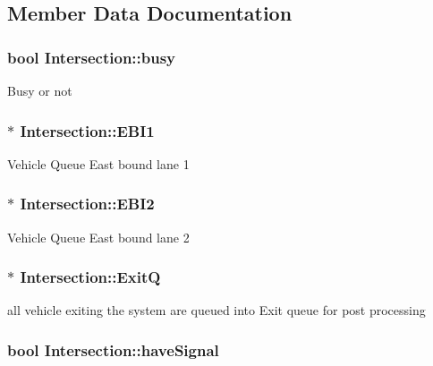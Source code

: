 \subsection{Member Data Documentation}
\hypertarget{class_intersection_ac7c8fd3e12e9df00670ae7c0f77d1e17}{
\subsubsection[{busy}]{\setlength{\rightskip}{0pt plus 5cm}bool Intersection\-::busy\hspace{0.3cm}{\ttfamily [protected]}}}\label{class_intersection_ac7c8fd3e12e9df00670ae7c0f77d1e17}
Busy or not \hypertarget{class_intersection_a8a64af1004807f4ac451bcf9bfa368a4}{
\subsubsection[{E\-B\-I1}]{$\ast$ Intersection\-::\-E\-B\-I1}}\label{class_intersection_a8a64af1004807f4ac451bcf9bfa368a4}
Vehicle Queue East bound lane 1 \hypertarget{class_intersection_a8db85628804847f2b98fd1edf5c28e34}{
\subsubsection[{E\-B\-I2}]{$\ast$ Intersection\-::\-E\-B\-I2}}\label{class_intersection_a8db85628804847f2b98fd1edf5c28e34}
Vehicle Queue East bound lane 2 \hypertarget{class_intersection_a2456746faabd194633c2b133440449c6}{
\subsubsection[{Exit\-Q}]{$\ast$ Intersection\-::\-Exit\-Q}}\label{class_intersection_a2456746faabd194633c2b133440449c6}
all vehicle exiting the system are queued into Exit queue for post processing \hypertarget{class_intersection_a6c8f8ad77cc05de03282b613001a5729}{
\subsubsection[{have\-Signal}]{\setlength{\rightskip}{0pt plus 5cm}bool Intersection\-::have\-Signal\hspace{0.3cm}{\ttfamily [protected]}}}\label{class_intersection_a6c8f8ad77cc05de03282b613001a5729}
